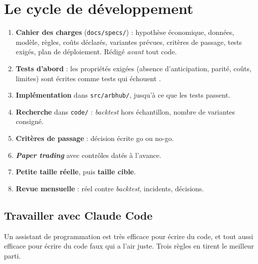 \section{Le cycle de développement}

\begin{enumerate}
\item \textbf{Cahier des charges} (\texttt{docs/specs/}) : hypothèse économique, données, modèle, règles, coûts déclarés, variantes prévues, critères de passage, tests exigés, plan de déploiement. Rédigé \emph{avant} tout code.
\item \textbf{Tests d'abord} : les propriétés exigées (absence d'anticipation, parité, coûts, limites) sont écrites comme tests qui échouent \citep{beck2002}.
\item \textbf{Implémentation} dans \texttt{src/arbhub/}, jusqu'à ce que les tests passent.
\item \textbf{Recherche} dans \texttt{code/} : \emph{backtest} hors échantillon, nombre de variantes consigné.
\item \textbf{Critères de passage} : décision écrite \og go\fg{} ou \og no-go\fg.
\item \textbf{\emph{Paper trading}} avec contrôles datés à l'avance.
\item \textbf{Petite taille réelle}, puis \textbf{taille cible}.
\item \textbf{Revue mensuelle} : réel contre \emph{backtest}, incidents, décisions.
\end{enumerate}

\subsection{Travailler avec Claude Code}

Un assistant de programmation est très efficace pour écrire du code, et tout aussi efficace pour écrire du code faux qui \og a l'air juste\fg. Trois règles en tirent le meilleur parti.

